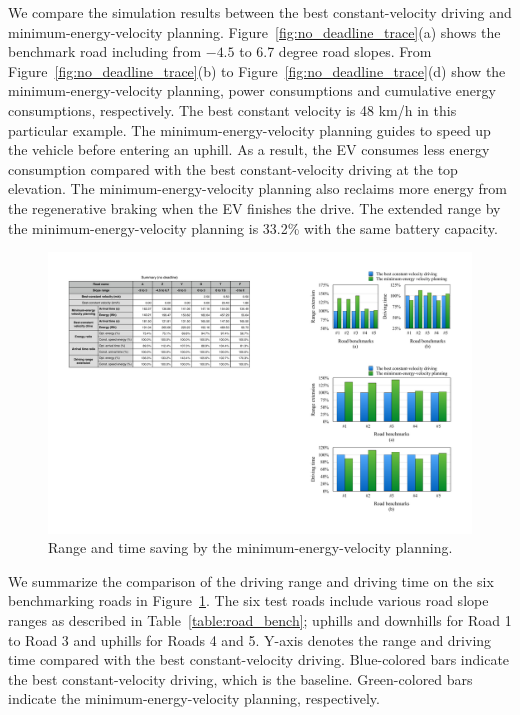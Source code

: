 \documentclass{IEEEtran}
\begin{document}
We compare the simulation results between the best constant-velocity driving and minimum-energy-velocity planning. Figure~\ref{fig:no_deadline_trace}(a) shows the benchmark road including from $-4.5$ to 6.7 degree road slopes. From Figure~\ref{fig:no_deadline_trace}(b) to Figure~\ref{fig:no_deadline_trace}(d) show the minimum-energy-velocity planning, power consumptions and cumulative energy consumptions, respectively. The best constant velocity is 48 km/h in this particular example. The minimum-energy-velocity planning guides to speed up the vehicle before entering an uphill. As a result, the EV consumes less energy consumption compared with the best constant-velocity driving at the top elevation. The minimum-energy-velocity planning also reclaims more energy from the regenerative braking when the EV finishes the drive. The extended range by the minimum-energy-velocity planning is 33.2\% with the same battery capacity.

\begin{figure}	 %
\includegraphics[width=1.0\hsize]{Figures/no_deadline_bar.pdf}
\caption{Range and time saving by the minimum-energy-velocity planning.}
\label{fig:no_deadline_bar}
\end{figure} 

We summarize the comparison of the driving range and driving time on the six benchmarking roads in Figure~\ref{fig:no_deadline_bar}. The six test roads include various road slope ranges as described in Table~\ref{table:road_bench}; uphills and downhills for Road 1 to Road 3 and uphills for Roads 4 and 5. Y-axis denotes the range and driving time compared with the best constant-velocity driving. Blue-colored bars indicate the best constant-velocity driving, which is the baseline. Green-colored bars indicate the minimum-energy-velocity planning, respectively.
\end{document}
